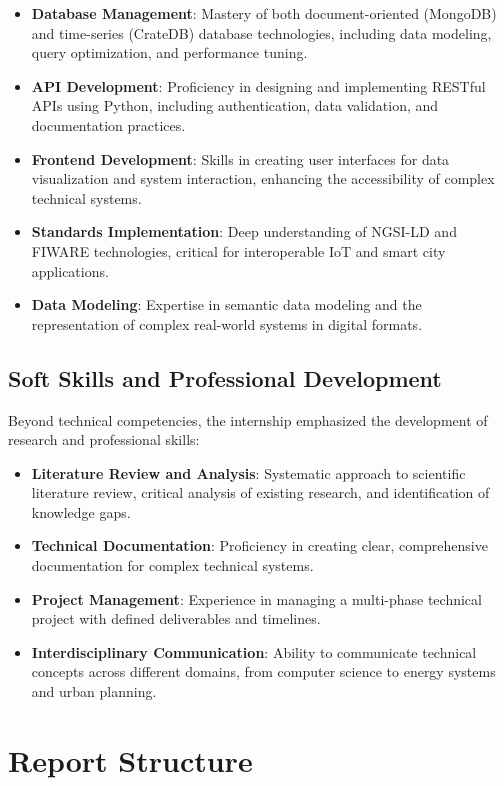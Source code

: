 \begin{itemize}
    \item \textbf{Database Management}: Mastery of both document-oriented (MongoDB) and time-series (CrateDB) database technologies, including data modeling, query optimization, and performance tuning.
    \item \textbf{API Development}: Proficiency in designing and implementing RESTful APIs using Python, including authentication, data validation, and documentation practices.
    \item \textbf{Frontend Development}: Skills in creating user interfaces for data visualization and system interaction, enhancing the accessibility of complex technical systems.
    \item \textbf{Standards Implementation}: Deep understanding of NGSI-LD and FIWARE technologies, critical for interoperable IoT and smart city applications.
    \item \textbf{Data Modeling}: Expertise in semantic data modeling and the representation of complex real-world systems in digital formats.
\end{itemize}

\subsection{Soft Skills and Professional Development}

Beyond technical competencies, the internship emphasized the development of research and professional skills:

\begin{itemize}
    \item \textbf{Literature Review and Analysis}: Systematic approach to scientific literature review, critical analysis of existing research, and identification of knowledge gaps.
    \item \textbf{Technical Documentation}: Proficiency in creating clear, comprehensive documentation for complex technical systems.
    \item \textbf{Project Management}: Experience in managing a multi-phase technical project with defined deliverables and timelines.
    \item \textbf{Interdisciplinary Communication}: Ability to communicate technical concepts across different domains, from computer science to energy systems and urban planning.
\end{itemize}

\section{Report Structure}


